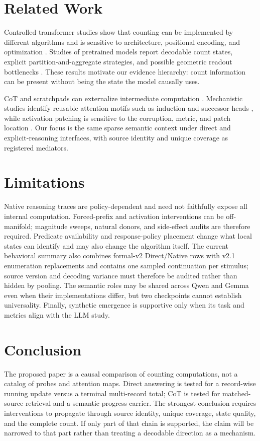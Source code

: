 \documentclass[10pt,twocolumn]{article}
\begin{document}
\section{Related Work}
Controlled transformer studies show that counting can be implemented by different algorithms and
is sensitive to architecture, positional encoding, and optimization
\citep{golkar2024contextual,yehudai2024count,chang2025inductive,behrens2025counting}.
Studies of pretrained models report decodable count states, explicit partition-and-aggregate
strategies, and possible geometric readout bottlenecks
\citep{hasani2026understanding,hasani2026system2,garcia2026direction}.
These results motivate our evidence hierarchy: count information can be present without being
the state the model causally uses.

CoT and scratchpads can externalize intermediate computation
\citep{nye2021scratchpad,wei2022cot}. Mechanistic studies identify reusable attention motifs such
as induction and successor heads \citep{olsson2022induction,gould2023successor}, while activation
patching is sensitive to the corruption, metric, and patch location
\citep{zhang2024patching}. Our focus is the same sparse semantic context under direct and
explicit-reasoning interfaces, with source identity and unique coverage as registered mediators.

\section{Limitations}
Native reasoning traces are policy-dependent and need not faithfully expose all internal
computation. Forced-prefix and activation interventions can be off-manifold; magnitude sweeps,
natural donors, and side-effect audits are therefore required. Predicate availability and
response-policy placement change what local states can identify and may also change the
algorithm itself. The current behavioral summary also combines formal-v2 Direct/Native rows
with v2.1 enumeration replacements and contains one sampled continuation per stimulus; source
version and decoding variance must therefore be audited rather than hidden by pooling. The
semantic roles may be shared
across Qwen and Gemma even when their implementations differ, but two checkpoints cannot
establish universality. Finally, synthetic emergence is supportive only when its task and
metrics align with the LLM study.

\section{Conclusion}
The proposed paper is a causal comparison of counting computations, not a catalog of probes and
attention maps. Direct answering is tested for a record-wise running update versus a terminal
multi-record total; CoT is tested for matched-source retrieval and a semantic progress carrier.
The strongest conclusion requires interventions to propagate through source identity, unique
coverage, state quality, and the complete count. If only part of that chain is supported, the
claim will be narrowed to that part rather than treating a decodable direction as a mechanism.
\end{document}
